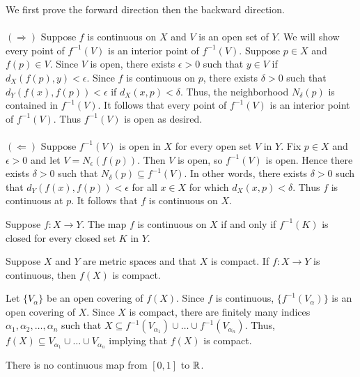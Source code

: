 \documentclass{mathnotes}
\begin{document}
\begin{pf}
  We first prove the forward direction then the backward direction.\\\\
  $(\Rightarrow)$ Suppose $f$ is continuous on $X$ and $V$ is an open set of
  $Y$. We will show every point of $f^{-1}(V)$ is an interior point of
  $f^{-1}(V)$. Suppose $p\in X$ and $f(p)\in V$. Since $V$ is open, there
  exists $\epsilon>0$ such that $y\in V$ if $d_X(f(p),y)<\epsilon$. Since $f$
  is continuous on $p$, there exists $\delta>0$ such that
  $d_Y(f(x),f(p))<\epsilon$ if $d_X(x,p)<\delta$. Thus, the neighborhood
  $N_\delta(p)$ is contained in $f^{-1}(V)$. It follows that every point of
  $f^{-1}(V)$ is an interior point of $f^{-1}(V)$. Thus $f^{-1}(V)$ is open as
  desired.\\\\
  $(\Leftarrow)$ Suppose $f^{-1}(V)$ is open in $X$ for every open set $V$ in
  $Y$. Fix $p\in X$ and $\epsilon>0$ and let $V=N_\epsilon(f(p))$. Then $V$ is
  open, so $f^{-1}(V)$ is open. Hence there exists $\delta>0$ such that
  $N_\delta(p)\subseteq f^{-1}(V)$. In other words, there exists $\delta>0$
  such that $d_Y(f(x),f(p))<\epsilon$ for all $x\in X$ for which
  $d_X(x,p)<\delta$. Thus $f$ is continuous at $p$. It follows that $f$ is
  continuous on $X$.
\end{pf}

\begin{prop}
  Suppose $f:X\to Y$. The map $f$ is continuous on $X$ if and only if
  $f^{-1}(K)$ is closed for every closed set $K$ in $Y$.
\end{prop}

\begin{prop}
  Suppose $X$ and $Y$ are metric spaces and that $X$ is compact. If $f:X\to Y$
  is continuous, then $f(X)$ is compact.
\end{prop}

\begin{pf}
  Let $\{V_\alpha\}$ be an open covering of $f(X)$. Since $f$ is continuous,
  $\{f^{-1}(V_\alpha)\}$ is an open covering of $X$. Since $X$ is compact,
  there are finitely many indices $\alpha_1,\alpha_2,\ldots,\alpha_n$ such that
  $X\subseteq f^{-1}(V_{\alpha_1})\cup\ldots\cup f^{-1}(V_{\alpha_n})$. Thus,
  $f(X)\subseteq V_{\alpha_1}\cup\ldots\cup V_{\alpha_n}$ implying that $f(X)$
  is compact.
\end{pf}

\begin{ex}
  There is no continuous map from $[0,1]$ to $\mathbb{R}$.
\end{ex}
\end{document}
